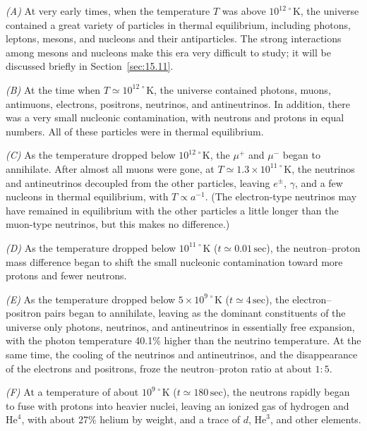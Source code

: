 \emph{(A)} At very early times, when the temperature \(T\) was above
\(10^{12\,\circ}\mathrm K\), the universe contained a great variety of
particles in thermal equilibrium, including photons, leptons, mesons, and
nucleons and their antiparticles. The strong interactions among mesons and
nucleons make this era very difficult to study; it will be discussed briefly
in Section~\ref{sec:15.11}.

\emph{(B)} At the time when \(T\simeq10^{12\,\circ}\mathrm K\), the universe
contained photons, muons, antimuons, electrons, positrons, neutrinos, and
antineutrinos. In addition, there was a very small nucleonic contamination,
with neutrons and protons in equal numbers. All of these particles were in
thermal equilibrium.

\emph{(C)} As the temperature dropped below \(10^{12\,\circ}\mathrm K\), the
\(\mu^+\) and \(\mu^-\) began to annihilate. After almost all muons were gone,
at \(T\simeq1.3\times10^{11\,\circ}\mathrm K\), the neutrinos and
antineutrinos decoupled from the other particles, leaving \(e^\pm\), \(\gamma\),
and a few nucleons in thermal equilibrium, with \(T\propto a^{-1}\).
(The electron-type neutrinos may have remained in equilibrium with the other
particles a little longer than the muon-type neutrinos, but this makes no
difference.)



\emph{(D)} As the temperature dropped below \(10^{11\,\circ}\mathrm K\)
(\(t\simeq0.01\,\mathrm{sec}\)), the neutron--proton mass difference began to
shift the small nucleonic contamination toward more protons and fewer neutrons.

\emph{(E)} As the temperature dropped below
\(5\times10^{9\,\circ}\mathrm K\) (\(t\simeq4\,\mathrm{sec}\)), the
electron--positron pairs began to annihilate, leaving as the dominant
constituents of the universe only photons, neutrinos, and antineutrinos in
essentially free expansion, with the photon temperature 40.1\% higher than the
neutrino temperature. At the same time, the cooling of the neutrinos and
antineutrinos, and the disappearance of the electrons and positrons, froze the
neutron--proton ratio at about \(1:5\).

\emph{(F)} At a temperature of about \(10^{9\,\circ}\mathrm K\)
(\(t\simeq180\,\mathrm{sec}\)), the neutrons rapidly began to fuse with protons
into heavier nuclei, leaving an ionized gas of hydrogen and
\(\mathrm{He}^4\), with about 27\% helium by weight, and a trace of
\(d\), \(\mathrm{He}^3\), and other elements.

